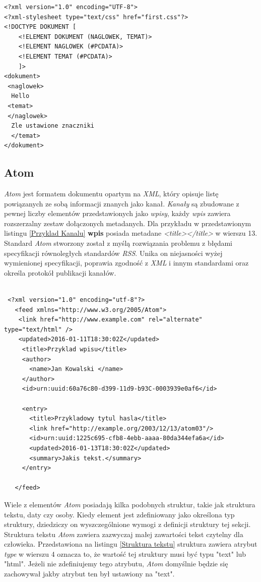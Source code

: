 \documentclass{iiuwb}
\begin{document}
\begin{lstlisting}[label=Walidacja XML, caption=Definicja typu dokumentu umieszczona w tym samym dokumencie]
<?xml version="1.0" encoding="UTF-8">
<?xml-stylesheet type="text/css" href="first.css"?>
<!DOCTYPE DOKUMENT [
	<!ELEMENT DOKUMENT (NAGLOWEK, TEMAT)>
	<!ELEMENT NAGLOWEK (#PCDATA)>
	<!ELEMENT TEMAT (#PCDATA)>
	]>
<dokument>
 <naglowek>
  Hello
 <temat>
 </naglowek>
  Zle ustawione znaczniki
  </temat>
</dokument>
\end{lstlisting}
\subsection{Atom}
\textit{Atom} \cite{Nottingam:05:Atom} jest formatem dokumentu opartym na \textit{XML}, który opisuje listę powiązanych ze sobą informacji znanych jako kanał.  \textit{Kanały} są zbudowane z pewnej liczby elementów przedstawionych jako \textit{wpisy}, każdy \textit{wpis} zawiera rozszerzalny zestaw dołączonych metadanych. Dla przykładu w przedstawionym listingu \ref{Przyklad Kanalu} \textbf{wpis} posiada metadane \textit{<title></title>} w wierszu 13.
Standard \textit{Atom} stworzony został z myślą rozwiązania problemu z błędami specyfikacji równoległych standardów \textit{RSS}. Unika on niejasności wyżej wymienionej specyfikacji, poprawia zgodność z \textit{XML} i innym standardami oraz określa protokół publikacji kanałów.
\begin{lstlisting}[label=Przyklad Kanalu, caption=Przykład wpisu w Atom]

 <?xml version="1.0" encoding="utf-8"?>
   <feed xmlns="http://www.w3.org/2005/Atom">
	<link href="http://www.example.com" rel="alternate" type="text/html" />
	<updated>2016-01-11T18:30:02Z</updated>
     <title>Przyklad wpisu</title>
     <author>
       <name>Jan Kowalski </name>
     </author>
     <id>urn:uuid:60a76c80-d399-11d9-b93C-0003939e0af6</id>

     <entry>
       <title>Przykladowy tytul hasla</title>
       <link href="http://example.org/2003/12/13/atom03"/>
       <id>urn:uuid:1225c695-cfb8-4ebb-aaaa-80da344efa6a</id>
       <updated>2016-01-13T18:30:02Z</updated>
       <summary>Jakis tekst.</summary>
     </entry>

   </feed>

\end{lstlisting}

Wiele z elementów \textit{Atom} posiadają kilka podobnych struktur, takie jak struktura tekstu, daty czy osoby. Kiedy element jest zdefiniowany jako określona typ struktury, dziedziczy on wyszczególnione wymogi z definicji struktury tej sekcji. Struktura tekstu \textit{Atom} zawiera zazwyczaj małej zawartości tekst czytelny dla człowieka. Przedstawiona na listingu \ref{Struktura tekstu} struktura zawiera atrybut \textit{type} w wierszu 4 oznacza to, że wartość tej struktury musi być typu "text" lub "html". Jeżeli nie zdefiniujemy tego atrybutu, \textit{Atom}  domyślnie będzie się zachowywał jakby atrybut ten był ustawiony na "text".
\end{document}
